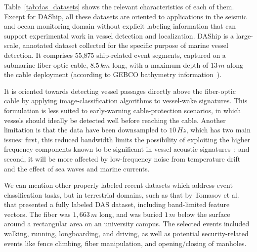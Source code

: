 \documentclass[11pt]{article}
\begin{document}
Table~\ref{tab:das_datasets} shows the relevant characteristics of each of them. Except for DAShip, all these datasets are oriented to applications in the seismic and ocean monitoring domain without explicit labeling information that can support experimental work in vessel detection and localization. DAShip is a large-scale, annotated dataset collected for the specific purpose of marine vessel detection. It comprises 55,875 ship-related event segments, captured on a submarine fiber-optic cable, $8.5\,km$ long, with a maximum depth of $13\,m$ along the cable deployment (according to GEBCO bathymetry information~\cite{gebco2024}).

It is oriented towards detecting vessel passages directly above the fiber-optic cable by applying image-classification algorithms to vessel-wake signatures. This formulation is less suited to early-warning cable-protection scenarios, in which vessels should ideally be detected well before reaching the cable. Another limitation is that the data have been downsampled to $10\,Hz$, which has two main issues: first, this reduced bandwidth limits the possibility of exploiting the higher frequency components known to be significant in vessel acoustic signatures~\cite{Rivet_2021,Thiem_2023}; and second, it will be more affected by low-frequency noise from temperature drift and the effect of sea waves and marine currents.

We can mention other properly labeled recent datasets which address event classification tasks, but in terrestrial domains, such as that by Tomasov et al.~\cite{tomasov2025comprehensive} that presented a fully labeled DAS dataset, including band-limited feature vectors. The fiber was $1{,}663\,m$ long, and was buried $1\,m$ below the surface around a rectangular area on an university campus. The selected events included walking, running, longboarding, and driving, as well as potential security-related events like fence climbing, fiber manipulation, and opening/closing of manholes.
\end{document}
